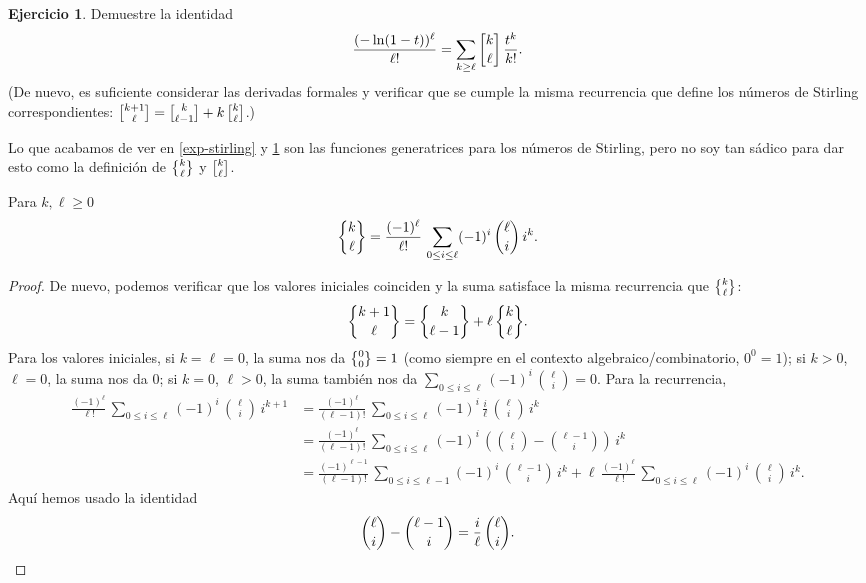 \documentclass{article}
\numberwithin{equation}{section}
\theoremstyle{definition}
\newtheorem{ejercicio}{Ejercicio}
\begin{document}
\begin{ejercicio}
  \label{log-stirling}
  Demuestre la identidad
  $$\frac{(-\ln (1-t))^\ell}{\ell!} = \sum_{k \ge \ell} \stirling{k}{\ell}\,\frac{t^k}{k!}.$$
  (De nuevo, es suficiente considerar las derivadas formales y verificar que se
  cumple la misma recurrencia que define los números de Stirling
  correspondientes:
  $\stirling{k+1}{\ell} = \stirling{k}{\ell-1} + k\,\stirling{k}{\ell}$.)
\end{ejercicio}

Lo que acabamos de ver en \ref{exp-stirling} y \ref{log-stirling} son las
funciones generatrices para los números de Stirling, pero no soy tan sádico para
dar esto como la definición de $\Stirling{k}{\ell}$ y $\stirling{k}{\ell}$.

\begin{lema}
  \label{stirling-via-binomial}
  Para $k,\ell\ge 0$
  $$\Stirling{k}{\ell} = \frac{(-1)^\ell}{\ell!}\,\sum_{0 \le i \le \ell} (-1)^i \, {\ell \choose i} \, i^k.$$

  \begin{proof}
    De nuevo, podemos verificar que los valores iniciales coinciden y la suma
    satisface la misma recurrencia que $\Stirling{k}{\ell}$:
    $$\Stirling{k+1}{\ell} = \Stirling{k}{\ell-1} + \ell \, \Stirling{k}{\ell}.$$
    Para los valores iniciales, si $k = \ell = 0$, la suma nos da
    $\Stirling{0}{0} = 1$ (como siempre en el contexto algebraico/combinatorio,
    $0^0 = 1$); si $k > 0$, $\ell = 0$, la suma nos da $0$; si $k = 0$,
    $\ell > 0$, la suma también nos da
    $\sum_{0 \le i \le \ell} (-1)^i \, {\ell\choose i} = 0$. Para la
    recurrencia,
    \begin{align*}
      \frac{(-1)^\ell}{\ell!}\,\sum_{0 \le i \le \ell} (-1)^i \, {\ell \choose i} \, i^{k+1} & = \frac{(-1)^\ell}{(\ell-1)!}\,\sum_{0 \le i \le \ell} (-1)^i \, \frac{i}{\ell}\, {\ell \choose i} \, i^k \\
                                                                                             & = \frac{(-1)^\ell}{(\ell-1)!}\,\sum_{0 \le i \le \ell} (-1)^i \, \left({\ell \choose i} - {\ell - 1\choose i}\right) \, i^k \\
                                                                                             & = \frac{(-1)^{\ell-1}}{(\ell-1)!}\,\sum_{0 \le i \le \ell-1} (-1)^i \, {\ell - 1 \choose i} \, i^k + \ell\,\frac{(-1)^\ell}{\ell!}\,\sum_{0 \le i \le \ell} (-1)^i \, {\ell \choose i} \, i^k.
    \end{align*}
    Aquí hemos usado la identidad
    \[ {\ell \choose i} - {\ell - 1 \choose i} = \frac{i}{\ell}\,{\ell \choose i}. \qedhere \]
  \end{proof}
\end{lema}
\end{document}
